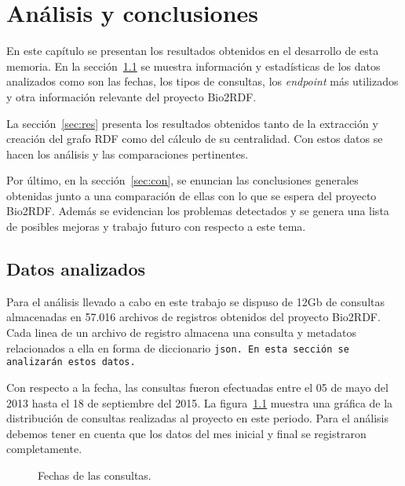 \chapter{Análisis y conclusiones}
En este capítulo se presentan los resultados obtenidos en el desarrollo de esta
memoria.
En la sección~\ref{sec:datos} se muestra información y estadísticas de los datos
analizados como son las fechas, los tipos de consultas, los \emph{endpoint} más
utilizados y otra información relevante del proyecto Bio2RDF.

La sección~\ref{sec:res} presenta los resultados obtenidos tanto de la
extracción y creación del grafo RDF como del cálculo de su centralidad. Con
estos datos se hacen los análisis y las comparaciones pertinentes.

Por último, en la sección~\ref{sec:con}, se enuncian las conclusiones generales
obtenidas junto a una comparación de ellas con lo que se espera del proyecto
Bio2RDF. Además se evidencian los problemas detectados y se genera una lista de
posibles mejoras y trabajo futuro con respecto a este tema.


\section{Datos analizados}\label{sec:datos}
Para el análisis llevado a cabo en este trabajo se dispuso de 12Gb de consultas
almacenadas en 57.016 archivos de registros obtenidos del proyecto Bio2RDF.
Cada linea de un archivo de registro almacena una consulta y metadatos 
relacionados a ella en forma de diccionario \tt{json}. En esta sección se
analizarán estos datos.

Con respecto a la fecha, las consultas fueron efectuadas entre el 05 de mayo del
2013 hasta el 18 de septiembre del 2015.
La figura~\ref{fig:dates} muestra una gráfica de la distribución de consultas
realizadas al proyecto en este periodo.
Para el análisis debemos tener en cuenta que los datos del mes inicial y final
se registraron completamente.

\begin{figure}[ht]
  \caption{Fechas de las consultas.}\label{fig:dates}
\end{figure}

